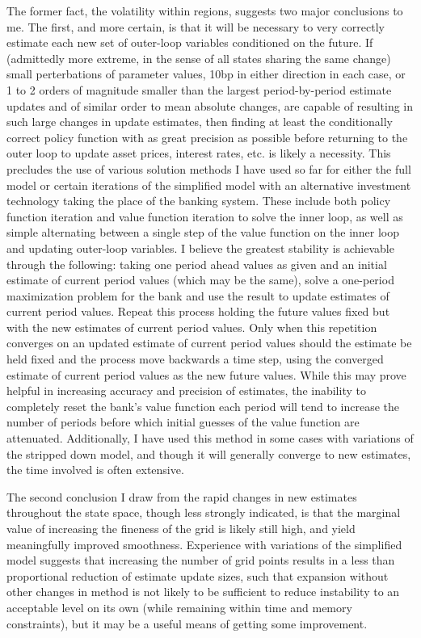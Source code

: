 \documentclass[english]{article}
\begin{document}
The former fact, the volatility within regions, suggests two major conclusions to me. The first, and more 
certain, is that it will be necessary to very correctly estimate each new set of outer-loop variables 
conditioned on the future. If (admittedly more extreme, in the sense of all states sharing the same change) 
small perterbations of parameter values, 10bp in either direction in each case, or 1 to 2 orders of magnitude 
smaller than the largest period-by-period estimate updates and of similar order to mean absolute changes, 
are capable of resulting in such large changes in update estimates, then finding at least the conditionally 
correct policy function with as great precision as possible before returning to the outer loop to update 
asset prices, interest rates, etc. is likely a necessity. This precludes the use of various solution methods 
I have used so far for either the full model or certain iterations of the simplified model with an alternative 
investment technology taking the place of the banking system. These include both policy function 
iteration and value function iteration to solve the inner loop, as well as simple alternating between 
a single step of the value function on the inner loop and updating outer-loop variables. I believe the 
greatest stability is achievable through the following: taking one period ahead values as given and 
an initial estimate of current period values (which may be the same), solve a one-period maximization 
problem for the bank and use the result to update estimates of current period values. Repeat this 
process holding the future values fixed but with the new estimates of current period values. Only 
when this repetition converges on an updated estimate of current period values should the estimate 
be held fixed and the process move backwards a time step, using the converged estimate of current 
period values as the new future values. While this may prove helpful in increasing accuracy and 
precision of estimates, the inability to completely reset the bank's value function each period will 
tend to increase the number of periods before which initial guesses of the value function are attenuated.
Additionally, I have used this method in some cases with variations of the 
stripped down model, and though it will generally converge to new estimates, the time involved is 
often extensive.

The second conclusion I draw from the rapid changes in new estimates throughout the state space, though 
less strongly indicated, is that the marginal value of increasing the fineness of the grid is likely still 
high, and yield meaningfully improved smoothness. Experience with variations of the simplified model 
suggests that increasing the number of grid points results in a less than proportional reduction of 
estimate update sizes, such that expansion without other changes in method is not likely to be sufficient 
to reduce instability to an acceptable level on its own (while remaining within time and memory constraints), 
but it may be a useful means of getting some improvement.
\end{document}
